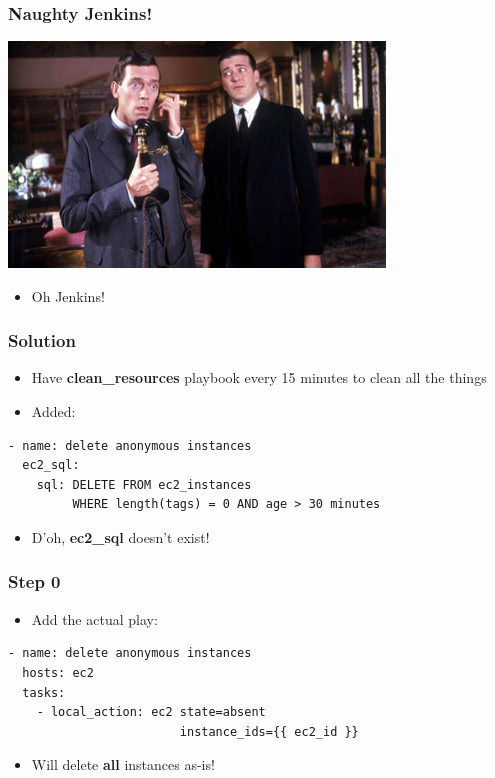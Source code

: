 \documentclass{beamer}
\begin{document}
\begin{frame}\frametitle{Naughty Jenkins!}

    \begin{center}
        \includegraphics[width=10cm]{jeeves}
    \end{center}

    \begin{itemize}
        \item Oh Jenkins!
    \end{itemize}

\end{frame}


\begin{frame}[fragile]\frametitle{Solution}

    \begin{itemize}
        \item Have \textbf{clean\_resources} playbook every 15 minutes to clean all the things
        \item Added:
    \end{itemize}

    \begin{lstlisting}
- name: delete anonymous instances
  ec2_sql:
    sql: DELETE FROM ec2_instances
         WHERE length(tags) = 0 AND age > 30 minutes
    \end{lstlisting}

    \begin{itemize}
        \item D'oh, \textbf{ec2\_sql} doesn't exist!
    \end{itemize}

\end{frame}


\begin{frame}[fragile]\frametitle{Step 0}

    \begin{itemize}
        \item Add the actual play:
    \end{itemize}

    \begin{lstlisting}
- name: delete anonymous instances
  hosts: ec2
  tasks:
    - local_action: ec2 state=absent
                        instance_ids={{ ec2_id }}
    \end{lstlisting}

    \begin{itemize}
        \item Will delete \textbf{all} instances as-is!
    \end{itemize}

\end{frame}
\end{document}
